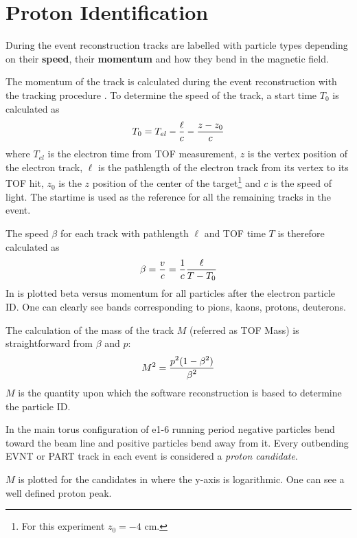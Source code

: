 \cia
\vspace{-2cm}
\section{Proton Identification} 
\label{sec:proton_id}
During the event reconstruction tracks are labelled with particle types
depending on their {\bf speed}, their {\bf momentum} and how they bend
in the magnetic field.

The momentum of the track is calculated during the event reconstruction
with the tracking procedure \cite{bib:tracking}. 
To determine the speed of the track, 
a start time $T_0$ is calculated as 
$$
 T_0 = T_{el} - \frac{\displaystyle \ell}{\displaystyle c} - \frac{\displaystyle z-z_0}{\displaystyle c}
$$
where $T_{el}$ is the electron time from TOF measurement,
$z$ is the vertex position of the electron track, $\ell$ is the  
pathlength of the electron track from its vertex to its TOF hit,
$z_0$ is the $z$ position of the center of the target\footnote{For this experiment $z_0 = -4$ cm.}
and $c$ is the speed of light.
The startime is used as the reference for all the remaining tracks in the event.

The speed $\beta$ for each track with pathlength $\ell$ and TOF time $T$ is 
therefore calculated as
$$
 \beta = \frac{\displaystyle v}{\displaystyle \it c} = \frac{\displaystyle 1}{\displaystyle c} \frac{\displaystyle \ell}{\displaystyle T-T_0}
$$
In  is plotted beta versus momentum for all particles after
the electron particle ID. 
One can clearly see bands corresponding to pions, kaons, protons, deuterons.

The calculation of the mass of the track $M$ (referred as TOF Mass) 
is straightforward from $\beta$ and $p$:
$$
 M^2 = \frac{\displaystyle p^2(1-\beta^2)}{\displaystyle \beta^2}
$$
$M$ is the quantity upon which the software reconstruction is based to 
determine the particle ID. 

In the main torus configuration of e1-6 running period
negative particles bend toward the beam line and positive particles
bend away from it.
Every outbending EVNT or PART track in each event is considered a {\it proton candidate}.

$M$ is plotted for the candidates in  where the y-axis is logarithmic.
One can see a well defined proton peak.

